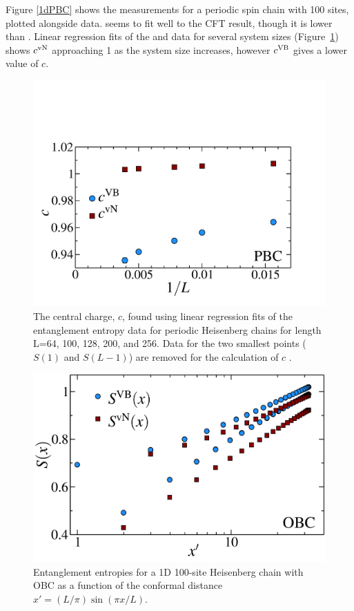 Figure \ref{1dPBC} shows the \vb measurements for a periodic spin chain with 100 sites, plotted alongside \vn data.  \vb seems to fit well to the CFT result, though it is lower than \vn.
Linear regression fits of the \vb and \vn data for several system sizes (Figure~\ref{c1}) shows $c^{\rm vN}$ approaching 1 as the system size increases, however $c^{\rm VB}$ gives a lower value of $c$.


\begin{figure} {
\includegraphics[width=6in]{./figures/paper1/figure1/thesis_c1.pdf} 
	\centering
	\caption[1D Results for VB EE and von Neumann EE]{
	The central charge, $c$, found using linear regression fits of the entanglement entropy data 	for periodic Heisenberg chains for length L=64, 100, 128, 200, and 256.  Data for the two smallest 	points ($S(1)$ and $S(L-1)$) are removed for the calculation of $c$ .
	\label{c1}}
} 
\end{figure}


\begin{figure} {
	\includegraphics[width=5.5in]{./figures/paper1/figure1/thesis_obc.pdf} 
	\centering
	\caption[1D OBC Results for VB EE and von Neumann EE]{
	Entanglement entropies for a 1D 100-site Heisenberg chain with OBC as a function of the conformal distance $x'  = (L/\pi)\sin (\pi x/L)$.
	\label{1dOBC}}}
\end{figure}

